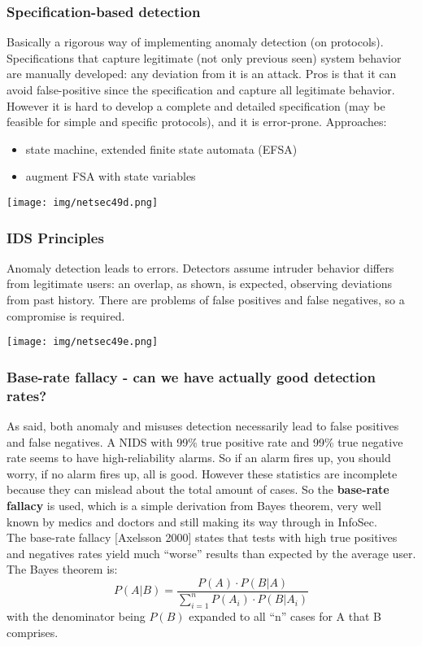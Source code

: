 \documentclass[a4paper, 10pt, titlepage]{article}
\begin{document}
\subsubsection*{Specification-based detection}
Basically a rigorous way of implementing anomaly detection (on protocols). Specifications that capture legitimate (not only previous seen) system behavior are manually developed: any deviation from it is an attack. Pros is that it can avoid false-positive since the specification and capture all legitimate behavior. However it is hard to develop a complete and detailed specification (may be feasible for simple and specific protocols), and it is error-prone. Approaches:
\begin{itemize}
	\item state machine, extended finite state automata (EFSA)
	\item augment FSA with state variables
\end{itemize}
\begin{center}
	\texttt{[image: img/netsec49d.png]}
\end{center}

\subsubsection*{IDS Principles}
Anomaly detection leads to errors. Detectors assume intruder behavior differs from legitimate users: an overlap, as shown, is expected, observing deviations from past history. There are problems of false positives and false negatives, so a compromise is required.
\begin{center}
	\texttt{[image: img/netsec49e.png]}
\end{center}

\subsubsection*{Base-rate fallacy - can we have actually good detection rates?}
As said, both anomaly and misuses detection necessarily lead to false positives and false negatives. A NIDS with 99\% true positive rate and 99\% true negative rate seems to have high-reliability alarms. So if an alarm fires up, you should worry, if no alarm fires up, all is good. However these statistics are incomplete because they can mislead about the total amount of cases. So the \textbf{base-rate fallacy} is used, which is a simple derivation from Bayes theorem, very well known by medics and doctors and still making its way through in InfoSec. \medskip\\
The base-rate fallacy [Axelsson 2000] states that tests with high true positives and negatives rates yield much “worse” results than expected by the average user. The Bayes theorem is:
$$P(A|B)= \dfrac{P(A)\cdot P(B|A)}{\sum_{i=1}^{n}P(A_i)\cdot P(B|A_i)}$$
with the denominator being $P(B)$ expanded to all “n” cases for A that B comprises. 
\end{document}

